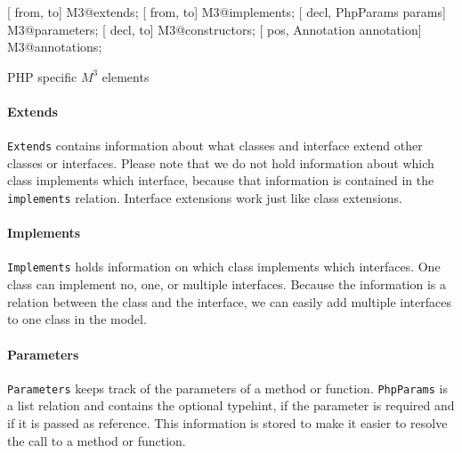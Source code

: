 \documentclass[../main.tex]{subfiles}
\begin{document}
    \begin{program}    
    \begin{rascal}%
 [ from,  to] M3@extends;    
 [ from,  to] M3@implements; 
 [ decl, PhpParams params] M3@parameters; 
 [ decl,  to] M3@constructors; 
 [ pos, Annotation annotation] M3@annotations; \end{rascal}%
	
	\caption{PHP specific $M^3$ elements}
	\label{fig:m3_php_elements}
	\end{program}
	    
	\paragraph{Extends} \texttt{Extends} contains information about what classes and interface extend other classes or interfaces.
	Please note that we do not hold information about which class implements which interface, because that information is contained in the \texttt{implements} relation.
    Interface extensions work just like class extensions.
    
    \paragraph{Implements} \texttt{Implements} holds information on which class implements which interfaces.
    One class can implement no, one, or multiple interfaces.
    Because the information is a relation between the class and the interface, we can easily add multiple interfaces to one class in the model.
    
    \paragraph{Parameters} \texttt{Parameters} keeps track of the parameters of a method or function.
    \texttt{PhpParams} is a list relation and contains the optional typehint, if the parameter is required and if it is passed as reference.
    This information is stored to make it easier to resolve the call to a method or function.
    
\end{document}

